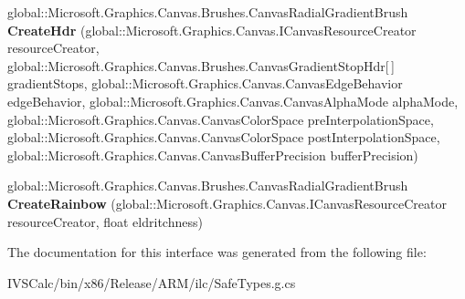 \begin{DoxyCompactItemize}
\item 
\mbox{\label{interface_microsoft_1_1_graphics_1_1_canvas_1_1_brushes_1_1_i_canvas_radial_gradient_brush_statics_a86665bd26bca12d2ecfcc18dc1a6ae1a}} 
global\+::\+Microsoft.\+Graphics.\+Canvas.\+Brushes.\+Canvas\+Radial\+Gradient\+Brush {\bfseries Create\+Hdr} (global\+::\+Microsoft.\+Graphics.\+Canvas.\+I\+Canvas\+Resource\+Creator resource\+Creator, global\+::\+Microsoft.\+Graphics.\+Canvas.\+Brushes.\+Canvas\+Gradient\+Stop\+Hdr\mbox{[}$\,$\mbox{]} gradient\+Stops, global\+::\+Microsoft.\+Graphics.\+Canvas.\+Canvas\+Edge\+Behavior edge\+Behavior, global\+::\+Microsoft.\+Graphics.\+Canvas.\+Canvas\+Alpha\+Mode alpha\+Mode, global\+::\+Microsoft.\+Graphics.\+Canvas.\+Canvas\+Color\+Space pre\+Interpolation\+Space, global\+::\+Microsoft.\+Graphics.\+Canvas.\+Canvas\+Color\+Space post\+Interpolation\+Space, global\+::\+Microsoft.\+Graphics.\+Canvas.\+Canvas\+Buffer\+Precision buffer\+Precision)
\item 
\mbox{\label{interface_microsoft_1_1_graphics_1_1_canvas_1_1_brushes_1_1_i_canvas_radial_gradient_brush_statics_a7dd980a2771ddc006a4a8a3c925e1be7}} 
global\+::\+Microsoft.\+Graphics.\+Canvas.\+Brushes.\+Canvas\+Radial\+Gradient\+Brush {\bfseries Create\+Rainbow} (global\+::\+Microsoft.\+Graphics.\+Canvas.\+I\+Canvas\+Resource\+Creator resource\+Creator, float eldritchness)
\end{DoxyCompactItemize}


The documentation for this interface was generated from the following file\+:\begin{DoxyCompactItemize}
\item 
I\+V\+S\+Calc/bin/x86/\+Release/\+A\+R\+M/ilc/Safe\+Types.\+g.\+cs\end{DoxyCompactItemize}
